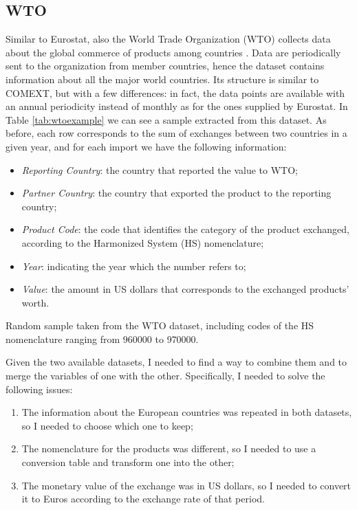 \subsection{WTO}
Similar to Eurostat, also the World Trade Organization (WTO) collects data about the global commerce of products among countries \cite{wto2022stats}. Data are periodically sent to the organization from member countries, hence the dataset contains information about all the major world countries.
Its structure is similar to COMEXT, but with a few differences: in fact, the data points are available with an annual periodicity instead of monthly as for the ones supplied by Eurostat. In Table \ref{tab:wtoexample} we can see a sample extracted from this dataset. As before, each row corresponds to the sum of exchanges between two countries in a given year, and for each import we have the following information:
\begin{itemize}
    \item \textit{Reporting Country}: the country that reported the value to WTO;
    \item \textit{Partner Country}: the country that exported the product to the reporting country;
    \item \textit{Product Code}: the code that identifies the category of the product exchanged, according to the Harmonized System (HS) nomenclature;
    \item \textit{Year}: indicating the year which the number refers to;
    \item \textit{Value}: the amount in US dollars that corresponds to the exchanged products' worth.
\end{itemize}

\begin{table}
    \centering
    
    \caption[Random sample taken from the WTO dataset]{Random sample taken from the WTO dataset, including codes of the HS nomenclature ranging from 960000 to 970000.}
    \label{tab:wtoexample}
\end{table}

Given the two available datasets, I needed to find a way to combine them and to merge the variables of one with the other. Specifically, I needed to solve the following issues:
\begin{enumerate}
    \item The information about the European countries was repeated in both datasets, so I needed to choose which one to keep;
    \item The nomenclature for the products was different, so I needed to use a conversion table and transform one into the other;
    \item The monetary value of the exchange was in US dollars, so I needed to convert it to Euros according to the exchange rate of that period.
\end{enumerate}

